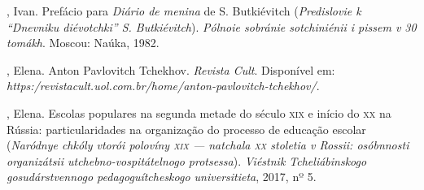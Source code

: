 \begin{bibliohedra}
, Ivan. Prefácio para \textit{Diário de menina} de S. Butkiévitch (\textit{Predislovie k “Dnevniku diévotchki” S. Butkiévitch}). \textit{Pólnoie sobránie sotchiniénii i pissem v 30 tomákh}. Moscou: Naúka, 1982.

, Elena. Anton Pavlovitch Tchekhov. \textit{Revista Cult}. Disponível em:
\textit{https:/revistacult.uol.com.br/home/anton-pavlovitch-tchekhov/}.

, Elena. Escolas populares na segunda metade do século \textsc{xix} e início do \textsc{xx} na Rússia: particularidades na organização do processo de educação escolar (\textit{Naródnye chkóly vtorói polovíny \textsc{xix} — natchala \textsc{xx} stoletia v Rossii: osóbnnosti organizátsii utchebno-vospitátelnogo protsessa}). \textit{Viéstnik Tcheliábinskogo gosudárstvennogo pedagoguítcheskogo universitieta}, 2017, nº 5.
\end{bibliohedra}


\endgroup
\pagebreak
